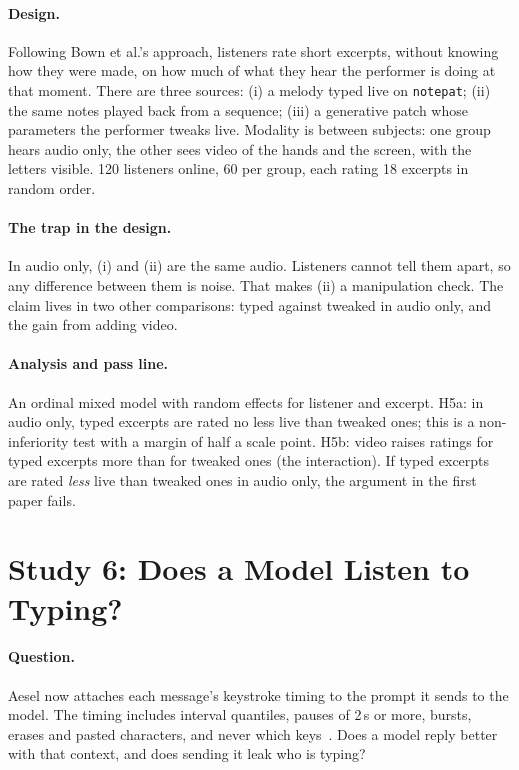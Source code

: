 \documentclass[10pt,letterpaper,twocolumn]{article}
\newcommand{\np}{\texttt{notepat}}
\begin{document}
\paragraph{Design.} Following Bown et al.'s approach, listeners rate short excerpts, without knowing how they were made, on how much of what they hear the performer is doing at that moment. There are three sources: (i) a melody typed live on \np{}; (ii) the same notes played back from a sequence; (iii) a generative patch whose parameters the performer tweaks live. Modality is between subjects: one group hears audio only, the other sees video of the hands and the screen, with the letters visible. 120 listeners online, 60 per group, each rating 18 excerpts in random order.

\paragraph{The trap in the design.} In audio only, (i) and (ii) are the same audio. Listeners cannot tell them apart, so any difference between them is noise. That makes (ii) a manipulation check. The claim lives in two other comparisons: typed against tweaked in audio only, and the gain from adding video.

\paragraph{Analysis and pass line.} An ordinal mixed model with random effects for listener and excerpt. H5a: in audio only, typed excerpts are rated no less live than tweaked ones; this is a non-inferiority test with a margin of half a scale point. H5b: video raises ratings for typed excerpts more than for tweaked ones (the interaction). If typed excerpts are rated \emph{less} live than tweaked ones in audio only, the argument in the first paper fails.

\section{Study 6: Does a Model Listen to Typing?}
\label{sec:s6}

\paragraph{Question.} Aesel now attaches each message's keystroke timing to the prompt it sends to the model. The timing includes interval quantiles, pauses of 2\,s or more, bursts, erases and pasted characters, and never which keys~\citep{scudder2026aesel}. Does a model reply better with that context, and does sending it leak who is typing?
\end{document}
